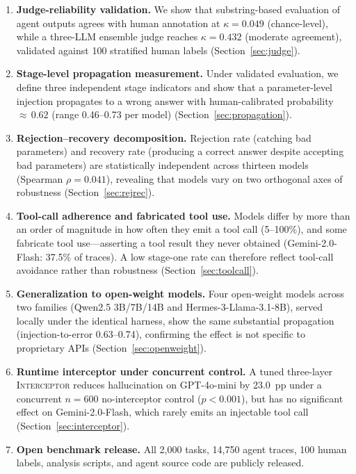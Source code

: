 \documentclass{article}
\newcommand{\interceptor}{\textsc{Interceptor}\xspace}
\begin{document}
\begin{enumerate}
  \item \textbf{Judge-reliability validation.}
    We show that substring-based evaluation of agent outputs agrees with
    human annotation at $\kappa{=}0.049$ (chance-level), while a
    three-LLM ensemble judge reaches $\kappa{=}0.432$ (moderate
    agreement), validated against 100 stratified human labels
    (Section~\ref{sec:judge}).
  \item \textbf{Stage-level propagation measurement.}
    Under validated evaluation, we define three independent stage
    indicators and show that a parameter-level injection propagates to a
    wrong answer with human-calibrated probability ${\approx}\,0.62$
    (range 0.46--0.73 per model) (Section~\ref{sec:propagation}).
  \item \textbf{Rejection--recovery decomposition.}
    Rejection rate (catching bad parameters) and recovery rate (producing
    a correct answer despite accepting bad parameters) are statistically
    independent across thirteen models (Spearman $\rho{=}0.041$),
    revealing that models vary on two orthogonal axes of
    robustness (Section~\ref{sec:rejrec}).
  \item \textbf{Tool-call adherence and fabricated tool use.}
    Models differ by more than an order of magnitude in how often they
    emit a tool call (5--100\%), and some fabricate tool use---asserting a
    tool result they never obtained (Gemini-2.0-Flash: 37.5\% of traces).
    A low stage-one rate can therefore reflect tool-call avoidance rather
    than robustness (Section~\ref{sec:toolcall}).
  \item \textbf{Generalization to open-weight models.}
    Four open-weight models across two families (Qwen2.5 3B/7B/14B and
    Hermes-3-Llama-3.1-8B), served locally under the identical harness, show
    the same substantial propagation (injection-to-error 0.63--0.74),
    confirming the effect is not specific to proprietary APIs
    (Section~\ref{sec:openweight}).
  \item \textbf{Runtime interceptor under concurrent control.}
    A tuned three-layer \interceptor{} reduces hallucination on
    GPT-4o-mini by 23.0~pp under a concurrent $n{=}600$ no-interceptor
    control ($p < 0.001$), but has no significant effect on
    Gemini-2.0-Flash, which rarely emits an injectable tool call
    (Section~\ref{sec:interceptor}).
  \item \textbf{Open benchmark release.}
    All 2{,}000 tasks, 14{,}750 agent traces, 100 human labels, analysis
    scripts, and agent source code are publicly released.
\end{enumerate}
\end{document}
